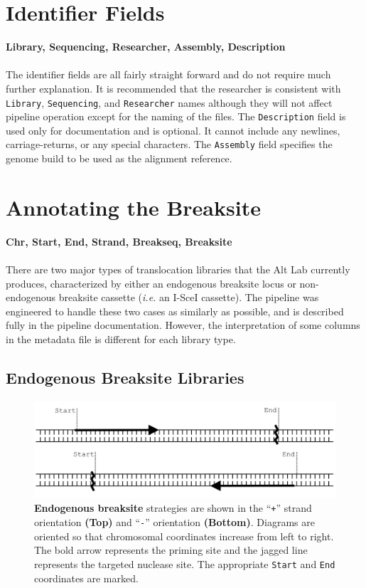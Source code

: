 \documentclass{article}
\begin{document}
\section{Identifier Fields}
\textbf{Library, Sequencing, Researcher, Assembly, Description}
\paragraph{} The identifier fields are all fairly straight forward and do not require much further explanation. It is recommended that the researcher is consistent with \texttt{Library}, \texttt{Sequencing}, and \texttt{Researcher} names although they will not affect pipeline operation except for the naming of the files. The \texttt{Description} field is used only for documentation and is optional. It cannot include any newlines, carriage-returns, or any special characters. The \texttt{Assembly} field specifies the genome build to be used as the alignment reference.

\section{Annotating the Breaksite}
\textbf{Chr, Start, End, Strand, Breakseq, Breaksite}
\paragraph{} There are two major types of translocation libraries that the Alt Lab currently produces, characterized by either an endogenous breaksite locus or non-endogenous breaksite cassette (\emph{i.e.} an I-SceI cassette). The pipeline was engineered to handle these two cases as similarly as possible, and is described fully in the pipeline documentation. However, the interpretation of some columns in the metadata file is different for each library type.

\subsection{Endogenous Breaksite Libraries}
\begin{figure}[H]
\centering
  \includegraphics[width=\textwidth]{endogenous_breaksite}
\caption{\textbf{Endogenous breaksite} strategies are shown in the ``\texttt{+}'' strand orientation \textbf{(Top)} and ``\texttt{-}'' orientation \textbf{(Bottom)}. Diagrams are oriented so that chromosomal coordinates increase from left to right. The bold arrow represents the priming site and the jagged line represents the targeted nuclease site. The appropriate \texttt{Start} and \texttt{End} coordinates are marked. }
\label{overflow}
\end{figure}
\end{document}
